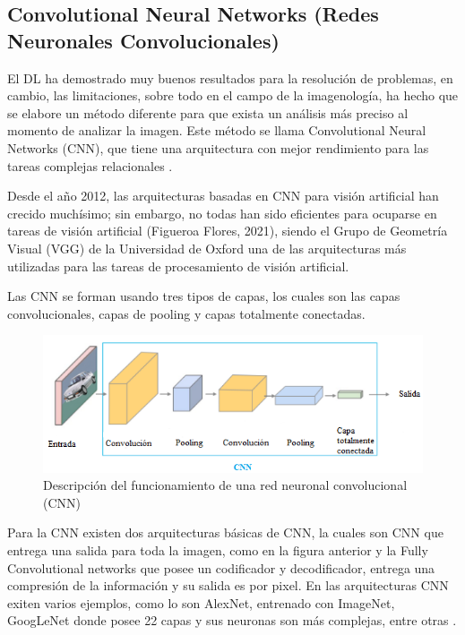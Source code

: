 \subsection{Convolutional Neural Networks (Redes Neuronales Convolucionales)}
El DL ha demostrado muy buenos resultados para la resolución de problemas, en cambio, las limitaciones, sobre todo en el campo de la imagenología, ha hecho que se elabore un método diferente para que exista un análisis más preciso al momento de analizar la imagen. Este método se llama Convolutional Neural Networks (CNN), que tiene una arquitectura con mejor rendimiento para las tareas complejas relacionales \cite{Pena-Torres}. \\
\par Desde el año 2012, las arquitecturas basadas en CNN para visión artificial han crecido muchísimo; sin embargo, no todas han sido eficientes para ocuparse en tareas de visión artificial (Figueroa Flores, 2021), siendo el Grupo de Geometría Visual (VGG) de la Universidad de Oxford \cite{Simonyan2015} una de las arquitecturas más utilizadas para las tareas de procesamiento de visión artificial. \\
\par Las CNN se forman usando tres tipos de capas, los cuales son las capas convolucionales, capas de pooling y capas totalmente conectadas.\\

\begin{figure}[h]
\centering
\includegraphics[scale=0.7]{img/Marco Teorico/convulcioinales.png}  
\caption{Descripción del funcionamiento de una red neuronal convolucional (CNN) }
\end{figure}

\par Para la CNN existen dos arquitecturas básicas de CNN, la cuales son CNN que entrega una salida para toda la imagen, como en la figura anterior y la Fully Convolutional networks que posee un codificador y decodificador, entrega una compresión de la información y su salida es por pixel. En las arquitecturas CNN exiten varios ejemplos, como lo son AlexNet, entrenado con ImageNet, GoogLeNet donde posee 22 capas y sus neuronas son más complejas, entre otras \cite{NIPS2012_c399862d}.\\

